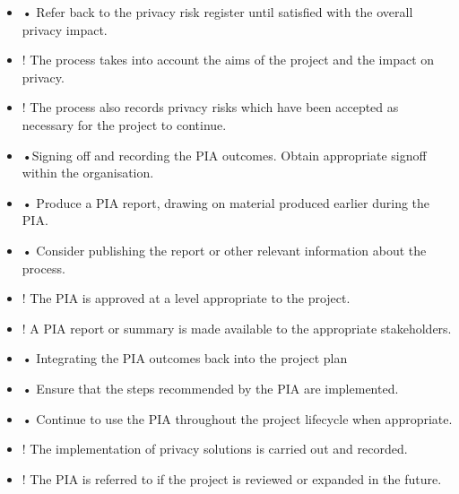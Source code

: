 \documentclass{article}
\begin{document}
\begin{itemize}
\item • Refer back to the privacy risk register until satisfied with the overall privacy impact.
\item ! The process takes into account the aims of the project and the impact on privacy. 
\item ! The process also records privacy risks which have been accepted as necessary for the project to continue.  
\item •Signing off and recording the PIA outcomes. Obtain appropriate signoff within the organisation. 
\item • Produce a PIA report, drawing on material produced earlier during the PIA.
\item • Consider publishing the report or other relevant information about the process.
\item ! The PIA is approved at a level appropriate to the project. 
\item ! A PIA report or summary is made available to the appropriate stakeholders.
\item • Integrating the PIA outcomes back into the project plan
\item • Ensure that the steps recommended by the PIA are implemented.
\item • Continue to use the PIA throughout the project lifecycle when appropriate. 
\item ! The implementation of privacy solutions is carried out and recorded.
\item ! The PIA is referred to if the project is reviewed or expanded in the future.
\end{itemize}
\end{document}
